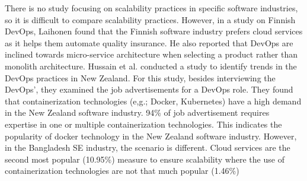 There is no study focusing on scalability practices in specific software industries, so it is difficult to compare scalability practices. However, in a study on Finnish DevOps, Laihonen\cite{Laihonen2018} found that the Finnish software industry prefers cloud services as it helps them automate quality insurance. He also reported that DevOps are inclined towards micro-service architecture when selecting a product rather than monolith architecture. Hussain et al.\cite{Hussain2017} conducted a study to identify trends in the DevOps practices in New Zealand. For this study, besides interviewing the DevOps', they examined the job advertisements for a DevOps role. They found that containerization technologies (e,g.; Docker, Kubernetes) have a high demand in the New Zealand software industry. 94\% of job advertisement requires expertise in one or multiple containerization technologies. This indicates the popularity of docker technology in the New Zealand software industry. However, in the Bangladesh SE industry, the scenario is different. Cloud services are the second most popular (10.95\%)  measure to ensure scalability where the use of containerization technologies are not that much popular (1.46\%)